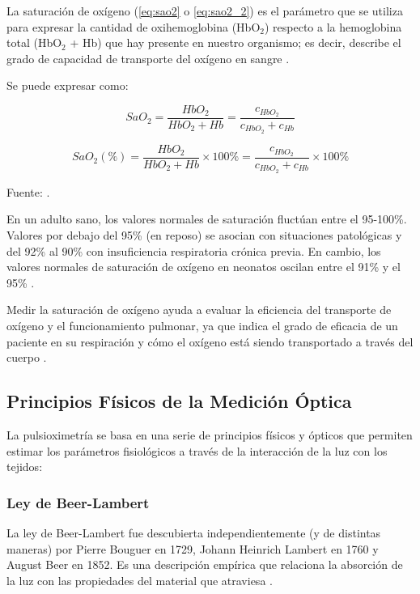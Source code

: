 La saturación de oxígeno (\ref{eq:sao2} o \ref{eq:sao2_2}) es el parámetro que se utiliza para expresar la cantidad de oxihemoglobina (HbO$_2$) respecto a la hemoglobina total (HbO$_2$ + Hb) que hay presente en nuestro organismo; es decir, describe el grado de capacidad de transporte del oxígeno en sangre \cite{gonzalez2019pulsioximetro}.

Se puede expresar como:

\begin{equation}
    SaO_2 = \frac{HbO_2}{HbO_2 + Hb} = \frac{c_{HbO_2}}{c_{HbO_2} + c_{Hb}}
    \label{eq:sao2}
\end{equation}

\begin{equation}
    SaO_2(\%) = \frac{HbO_2}{HbO_2 + Hb} \times 100\% = \frac{c_{HbO_2}}{c_{HbO_2} + c_{Hb}} \times 100\%
    \label{eq:sao2_2}
\end{equation}

\begin{center}
    Fuente: \cite{Alarco2015}.
\end{center}

En un adulto sano, los valores normales de saturación fluctúan entre el 95-100\%. Valores por debajo del 95\% (en reposo) se asocian con situaciones patológicas y del 92\% al 90\% con insuficiencia respiratoria crónica previa. En cambio, los valores normales de saturación de oxígeno en neonatos oscilan entre el 91\% y el 95\% \cite{vento2014oxigenoterapia}. 


Medir la saturación de oxígeno ayuda a evaluar la eficiencia del transporte de oxígeno y el funcionamiento pulmonar, ya que indica el grado de eficacia de un paciente en su respiración y cómo el oxígeno está siendo transportado a través del cuerpo \cite{weinmannEmergency2025}.

\subsection{Principios Físicos de la Medición Óptica }

La pulsioximetría se basa en una serie de principios físicos y ópticos que permiten estimar los parámetros fisiológicos a través de la interacción de la luz con los tejidos:


\subsubsection{Ley de Beer-Lambert}

La ley de Beer-Lambert fue descubierta independientemente (y de distintas maneras) por Pierre Bouguer en 1729, Johann Heinrich Lambert en 1760 y August Beer en 1852. Es una descripción empírica que relaciona la absorción de la luz con las propiedades del material que atraviesa \cite{Gilsanz2023}.

